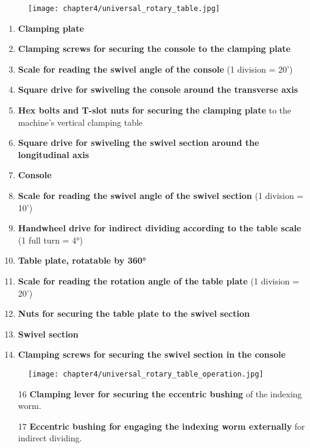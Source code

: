 \begin{figure}[h]
    \centering
    \texttt{[image: chapter4/universal\_rotary\_table.jpg]}
\end{figure}

\begin{enumerate}
    \item \textbf{Clamping plate}
    \item \textbf{Clamping screws for securing the console to the clamping plate}
    \item \textbf{Scale for reading the swivel angle of the console} (1 division = 20')
    \item \textbf{Square drive for swiveling the console around the transverse axis}
    \item \textbf{Hex bolts and T-slot nuts for securing the clamping plate} to the machine's vertical clamping table
    \item \textbf{Square drive for swiveling the swivel section around the longitudinal axis}
    \item \textbf{Console}
    \item \textbf{Scale for reading the swivel angle of the swivel section} (1 division = 10')
    \item \textbf{Handwheel drive for indirect dividing according to the table scale} (1 full turn = 4°)
    \item \textbf{Table plate, rotatable by 360°}
    \item \textbf{Scale for reading the rotation angle of the table plate} (1 division = 20')
    \item \textbf{Nuts for securing the table plate to the swivel section}
    \item \textbf{Swivel section}
    \item \textbf{Clamping screws for securing the swivel section in the console}
\end{enumerate}

\newpage

\begin{figure}[h]
    \centering
    \texttt{[image: chapter4/universal\_rotary\_table\_operation.jpg]}
\end{figure}

\begin{enumerate}
    \item[16] \textbf{Clamping lever for securing the eccentric bushing} of the indexing worm.
    \item[17] \textbf{Eccentric bushing for engaging the indexing worm externally} for indirect dividing.
\end{enumerate}

